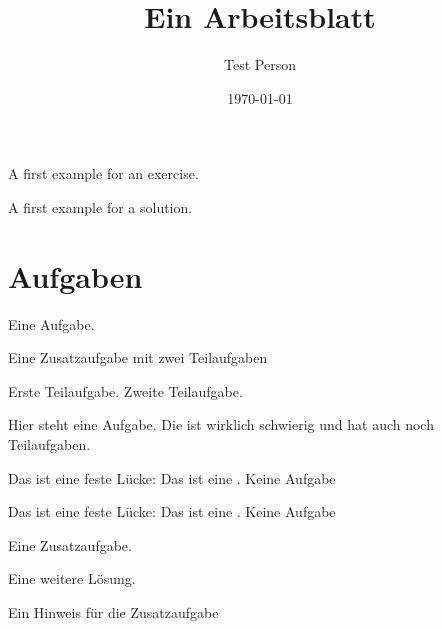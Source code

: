 \documentclass[a4paper]{scrartcl}
\author{Test Person}
\date{\today}
\title{Ein Arbeitsblatt}
\begin{document}
\section*{\Titel}
\blindtext

\begin{exercise}
    A first example for an exercise.
\end{exercise}

\begin{solution}
    A first example for a solution.
\end{solution}

\section*{Aufgaben}
\begin{aufgabe}
    Eine Aufgabe.
\end{aufgabe}

\begin{aufgabe}
    \setzeSymbol{\symHaken}
    Eine Zusatzaufgabe mit zwei Teilaufgaben
    \begin{teilaufgaben}
        \teilaufgabe Erste Teilaufgabe.
        \teilaufgabe Zweite Teilaufgabe.
    \end{teilaufgaben}
\end{aufgabe}

\begin{aufgabe}[points=10,bonus-points=5]
    Hier steht eine Aufgabe. Die ist wirklich schwierig und hat auch noch Teilaufgaben.
    \begin{teilaufgaben}
        \teilaufgabe Das ist eine feste Lücke: \luecke[style={\uwave{#1}}]{2cm}
        \teilaufgabe Das ist eine .
        \teilaufgabe Keine Aufgabe
    \end{teilaufgaben}

    \begin{loesung}
        \begin{teilaufgaben}
            \teilaufgabe Das ist eine feste Lücke: \luecke[style={\uwave{#1}}]{2cm}
            \teilaufgabe Das ist eine .
            \teilaufgabe Keine Aufgabe
        \end{teilaufgaben}
    \end{loesung}
\end{aufgabe}

\begin{aufgabe*}[points=10,bonus-points=5]
    Eine Zusatzaufgabe.
    \begin{loesung*}
        Eine weitere Lösung.
    \end{loesung*}
    \begin{bearbeitungshinweis}
        Ein Hinweis für die Zusatzaufgabe
    \end{bearbeitungshinweis}
\end{aufgabe*}
\end{document}
